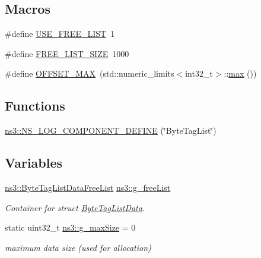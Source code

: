 \subsection*{Macros}
\begin{DoxyCompactItemize}
\item 
\#define \hyperlink{byte-tag-list_8cc_ac649801a058ea2f41d5730b681f4ef9f}{U\+S\+E\+\_\+\+F\+R\+E\+E\+\_\+\+L\+I\+ST}~1
\item 
\#define \hyperlink{byte-tag-list_8cc_a4a538c177154ed9284055c497ff3689f}{F\+R\+E\+E\+\_\+\+L\+I\+S\+T\+\_\+\+S\+I\+ZE}~1000
\item 
\#define \hyperlink{byte-tag-list_8cc_a8979c026ebd9183f6fef912f41c0cd5b}{O\+F\+F\+S\+E\+T\+\_\+\+M\+AX}~(std\+::numeric\+\_\+limits$<$int32\+\_\+t$>$\+::\hyperlink{80211b_8c_affe776513b24d84b39af8ab0930fef7f}{max} ())
\end{DoxyCompactItemize}
\subsection*{Functions}
\begin{DoxyCompactItemize}
\item 
\hyperlink{namespacens3_a0b8363165cfbb4b2eaf4456759e7d2a9}{ns3\+::\+N\+S\+\_\+\+L\+O\+G\+\_\+\+C\+O\+M\+P\+O\+N\+E\+N\+T\+\_\+\+D\+E\+F\+I\+NE} (\char`\"{}Byte\+Tag\+List\char`\"{})
\end{DoxyCompactItemize}
\subsection*{Variables}
\begin{DoxyCompactItemize}
\item 
\hyperlink{classns3_1_1ByteTagListDataFreeList}{ns3\+::\+Byte\+Tag\+List\+Data\+Free\+List} \hyperlink{group__packet_gaed1170b07d22fd956e755d86bf5e5f08}{ns3\+::g\+\_\+free\+List}
\begin{DoxyCompactList}\small\item\em Container for struct \hyperlink{structns3_1_1ByteTagListData}{Byte\+Tag\+List\+Data}. \end{DoxyCompactList}\item 
static uint32\+\_\+t \hyperlink{namespacens3_ad6ad8119b41070b28e1d8ec60839f48c}{ns3\+::g\+\_\+max\+Size} = 0
\begin{DoxyCompactList}\small\item\em maximum data size (used for allocation) \end{DoxyCompactList}\end{DoxyCompactItemize}


